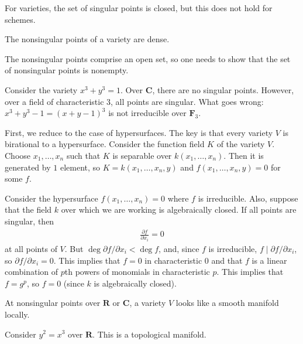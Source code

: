 \documentclass [11 pt, oneside, margin = 1 in] {article}
\begin{document}
\begin{warn}
	For varieties, the set of singular points is closed, but this does not hold for schemes.
\end{warn}

\begin{proposition}[ ]\label{}\text{}
The nonsingular points of a variety are dense.
\end{proposition}

The nonsingular points comprise an open set, so one needs to show that the set of nonsingular points is nonempty. 

\begin{example}[ ]\label{}\text{}
Consider the variety $x^3+y^3=1$. Over $\mathbf{C}$, there are no singular points. However, over a field of characteristic $3$, all points are singular. What goes wrong: $x^3+y^3-1=(x+y-1)^3$ is not irreducible over $\mathbf{F}_{3}$.
\end{example}


First, we reduce to the case of hypersurfaces. The key is that every variety $V$ is birational to a hypersurface. Consider the function field $K$ of the variety $V$. Choose $x_1,\hdots, x_n$ such that $K$ is separable over $k(x_1,\hdots, x_n)$. Then it is generated by $1$ element, so $K=k(x_1,\hdots, x_n,y)$ and $f(x_1,\hdots, x_n,y)=0$ for some $f$.

Consider the hypersurface $f(x_1,\hdots, x_n)=0$ where $f$ is irreducible. Also, suppose that the field $k$ over which we are working is algebraically closed. If all points are singular, then 
\begin{align*}
	\frac{\partial f}{\partial x_i} =0
\end{align*}
at all points of $V$. But $\deg \partial f/\partial x_i< \deg f$, and, since $f$ is irreducible, $f\mid \partial f/\partial x_i$, so $\partial f/\partial x_i =0$. This implies that $f=0$ in characteristic $0$ and that $f$ is a linear combination of $p$th powers of monomials in characteristic $p$. This implies that $f=g^p$, so $f=0$  (since $k$ is algebraically closed).

 \begin{remark}\label{convvv}
	At nonsingular points over $\mathbf{R}$ or $\mathbf{C}$, a variety $V$ looks like a smooth manifold locally.
\end{remark}

\begin{example}\label{}\text{}
Consider $y^2=x^3$ over $\mathbf{R}$. This is a topological manifold.
\end{example}
\end{document}
